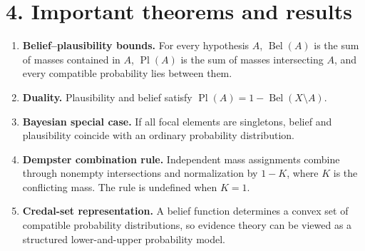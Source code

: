 \section*{4. Important theorems and results}
\begin{enumerate}[leftmargin=*,itemsep=0.35em]

\item \textbf{Belief--plausibility bounds.} For every hypothesis $A$, $\operatorname{Bel}(A)$ is the sum of masses contained in $A$, $\operatorname{Pl}(A)$ is the sum of masses intersecting $A$, and every compatible probability lies between them. \cite{dempster_shafer_theory_ref2}

\item \textbf{Duality.} Plausibility and belief satisfy $\operatorname{Pl}(A)=1-\operatorname{Bel}(X\setminus A)$. \cite{dempster_shafer_theory_ref2}

\item \textbf{Bayesian special case.} If all focal elements are singletons, belief and plausibility coincide with an ordinary probability distribution. \cite{dempster_shafer_theory_ref2}

\item \textbf{Dempster combination rule.} Independent mass assignments combine through nonempty intersections and normalization by $1-K$, where $K$ is the conflicting mass. The rule is undefined when $K=1$. \cite{dempster_shafer_theory_ref1,dempster_shafer_theory_ref5}

\item \textbf{Credal-set representation.} A belief function determines a convex set of compatible probability distributions, so evidence theory can be viewed as a structured lower-and-upper probability model. \cite{dempster_shafer_theory_ref9}
\end{enumerate}

\theoryapplications
{}
